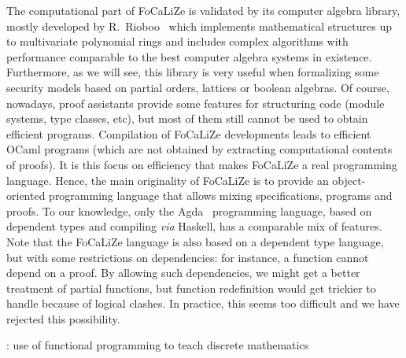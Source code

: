 \documentclass[submission,copyright,creativecommons]{eptcs}
\def\focalize{FoCaLiZe \mbox{}}
\begin{document}
The computational part of \focalize is validated
by its computer algebra library, mostly developed by
R.~Rioboo~\cite{calc01,DBLP:journals/amai/Rioboo09}
which implements mathematical structures up to multivariate 
polynomial rings and includes complex algorithms
with
performance comparable to the best computer algebra systems in
existence. Furthermore, as we will see, this library is very useful when formalizing
some security models based on
partial orders, lattices or boolean algebras.
Of course, nowadays, proof assistants provide some features for
structuring code (module systems, type classes, etc), but most of them
still cannot be used
to obtain efficient programs. 
Compilation of \focalize developments leads to efficient OCaml programs
(which are not obtained by extracting computational contents of
proofs). It is this focus on efficiency that makes \focalize a real programming
language. Hence, the main originality of \focalize is to provide an
object-oriented programming language that allows mixing
specifications, programs and
proofs. To our knowledge, only the Agda~\cite{conf/tphol/BoveDN09}
programming language, based on dependent types and compiling {\it via}
Haskell, has a comparable mix of features.
Note that the \focalize language is also based on a
dependent type language, but with some restrictions on dependencies:
for instance, a function
cannot depend on a proof.  By allowing such dependencies, we might get
a better treatment of partial functions, but function redefinition
would get trickier to handle because of logical clashes.
In practice, this seems
too difficult and we have rejected this possibility.


\cite{DBLP:conf/sigcse/Wainwright92}: use of functional programming to
teach discrete mathematics
\end{document}
